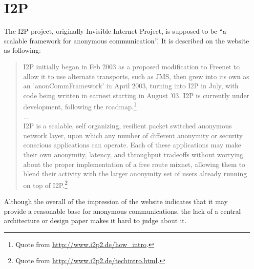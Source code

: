 \section{I2P}
The I2P project, originally Invisible Internet Project, is supposed to be
"`a scalable framework for anonymous communication"'.\cite{i2p} 
It is described on the website as following:
\begin{quote}
I2P initially began in Feb 2003 as a proposed modification to Freenet to allow it to use alternate transports, such as JMS, then grew into its own as an 'anonCommFramework' in April 2003, turning into I2P in July, with code being written in earnest starting in August '03. I2P is currently under development, 
following the roadmap.\footnote{Quote from \url{http://www.i2p2.de/how_intro}.}
\\
...
\\
I2P is a scalable, self organizing, resilient packet switched anonymous network layer, upon which any number of different anonymity or security conscious applications can operate. Each of these applications may make their own anonymity, latency, and throughput tradeoffs without worrying about the proper implementation of a free route mixnet, allowing them to blend their activity with the larger anonymity set of users already running on top of I2P.\footnote{Quote from \url{http://www.i2p2.de/techintro.html}.}
\end{quote}
Although the overall of the impression of the website indicates that it may provide a
reasonable base for anonymous communications, the lack of a central architecture or
design paper makes it hard to judge about it.
